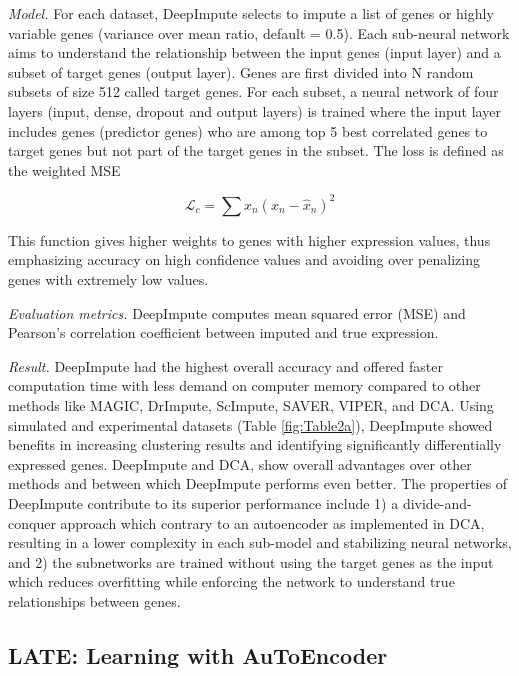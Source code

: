 \documentclass[
]{book}
\begin{document}
\emph{Model.} For each dataset, DeepImpute selects to impute a list of genes or highly variable genes (variance over mean ratio, default = 0.5). Each sub-neural network aims to understand the relationship between the input genes (input layer) and a subset of target genes (output layer). Genes are first divided into N random subsets of size 512 called target genes. For each subset, a neural network of four layers (input, dense, dropout and output layers) is trained where the input layer includes genes (predictor genes) who are among top 5 best correlated genes to target genes but not part of the target genes in the subset. The loss is defined as the weighted MSE

\begin{equation}
\mathcal{L}_{c}=\sum x_{n}(x_{n}-\hat{x}_{n})^{2}\label{eq:eq15}
\end{equation}

This function gives higher weights to genes with higher expression values, thus emphasizing accuracy on high confidence values and avoiding over penalizing genes with extremely low values.

\emph{Evaluation metrics.} DeepImpute computes mean squared error (MSE) and Pearson's correlation coefficient between imputed and true expression.

\emph{Result.} DeepImpute had the highest overall accuracy and offered faster computation time with less demand on computer memory compared to other methods like MAGIC, DrImpute, ScImpute, SAVER, VIPER, and DCA. Using simulated and experimental datasets (Table \ref{fig:Table2a}), DeepImpute showed benefits in increasing clustering results and identifying significantly differentially expressed genes. DeepImpute and DCA, show overall advantages over other methods and between which DeepImpute performs even better. The properties of DeepImpute contribute to its superior performance include 1) a divide-and-conquer approach which contrary to an autoencoder as implemented in DCA, resulting in a lower complexity in each sub-model and stabilizing neural networks, and 2) the subnetworks are trained without using the target genes as the input which reduces overfitting while enforcing the network to understand true relationships between genes.

\hypertarget{ch-5-1-4}{%
\subsection{LATE: Learning with AuToEncoder}\label{ch-5-1-4}}
\end{document}
